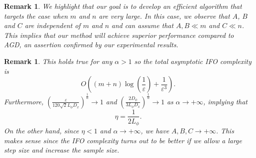 \documentclass[11pt]{article}
\newtheorem{remark}[theorem]{Remark}
\begin{document}
\begin{remark}
We highlight that our goal is to develop an efficient algorithm that targets the case when $m$ and $n$ are very large. In this case, we observe that $A$, $B$ and $C$ are independent of $m$ and $n$ and can assume that $A, B \ll m$ and $C \ll n$. This implies that our method will achieve superior performance compared to AGD, an assertion confirmed by our experimental results.
\end{remark}
\begin{remark}
This holds true for any $\alpha>1$ so the total asymptotic IFO complexity is
\begin{equation*}
O\left(\left(m+n\right)\log\left(\frac{1}{\varepsilon}\right) + \frac{1}{\varepsilon^{3}}\right).   
\end{equation*}
Furthermore, $\left(\frac{\varepsilon}{120\sqrt{2} L_\phi D_x }\right)^{\frac{1}{\alpha}} \rightarrow 1$ and 
$\left(\frac{2D_\phi}{3L_\phi D_x}\right)^{\frac{1}{\alpha}} \rightarrow 1$ as $\alpha\rightarrow+\infty$, implying that 
\begin{equation*}
\eta = \frac{1}{2L_\phi}. 
\end{equation*}
On the other hand, since $\eta<1$ and $\alpha\rightarrow+\infty$, we have $A, B, C\rightarrow +\infty$. This makes sense since the IFO complexity turns out to be better if we allow a large step size and increase the sample size. 
\end{remark}
\end{document}
